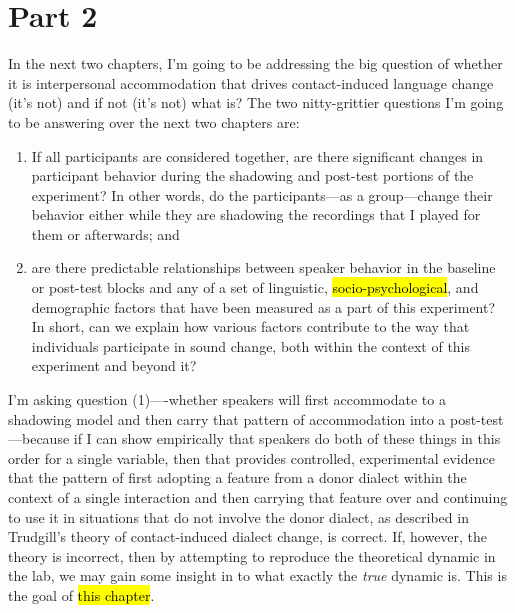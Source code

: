 \part{Part 2}
\label{part2}

    In the next two chapters, I'm going to be addressing the  big question of whether it is interpersonal accommodation that drives contact-induced language change (it's not) and if not (it's not) what is? The two nitty-grittier questions I'm going to be answering over the next two chapters are:
    \begin{enumerate}
        \item If all participants are considered together, are there significant changes in participant behavior during the shadowing and post-test portions of the experiment? In other words, do the participants---as a group---change their behavior either while they are shadowing the recordings that I played for them or afterwards; and
        \item are there predictable relationships between speaker behavior in the baseline or post-test blocks and any of a set of linguistic, \hl{socio-psychological}, and demographic factors that have been measured as a part of this experiment? In short, can we explain how various factors contribute to the way that individuals participate in sound change, both within the context of this experiment and beyond it?
    \end{enumerate}
    
    I'm asking question (1)----whether speakers will first accommodate to a shadowing model and then carry that pattern of accommodation into a post-test---because if I can show empirically that speakers do both of these things in this order for a single variable, then that provides controlled, experimental evidence that the pattern of first adopting a feature from a donor dialect within the context of a single interaction and then carrying that feature over and continuing to use it in situations that do not involve the donor dialect, as described in Trudgill's \citeyearpar{trudgill1986dialects} theory of contact-induced dialect change, is correct. If, however, the theory is incorrect, then by attempting to reproduce the theoretical dynamic in the lab, we may gain some insight in to what exactly the \emph{true} dynamic is. This is the goal of \hl{this chapter}.
    
